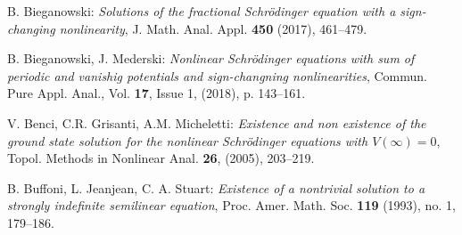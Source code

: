 \documentclass{scrartcl}
\numberwithin{equation}{section}
\begin{document}
\begin{thebibliography}{99}
 B. Bieganowski: {\em Solutions of the fractional Schrödinger equation with a sign-changing nonlinearity}, J. Math. Anal. Appl. \textbf{450} (2017), 461--479.

 B. Bieganowski, J. Mederski: {\em Nonlinear Schr\"odinger equations with sum of periodic and vanishig potentials and sign-changning nonlinearities}, Commun. Pure Appl. Anal., Vol. \textbf{17}, Issue 1, (2018), p. 143--161.




 V. Benci, C.R. Grisanti, A.M. Micheletti: {\em Existence and non existence of the ground state solution for the nonlinear Schr\"odinger equations with $V(\infty) = 0$}, Topol. Methods in Nonlinear Anal. \textbf{26}, (2005), 203--219.





 B. Buffoni, L. Jeanjean, C. A. Stuart: {\em Existence of a nontrivial solution to a strongly indefinite semilinear equation}, Proc. Amer. Math. Soc. \textbf{119} (1993), no. 1, 179--186. 



\end{thebibliography}
\end{document}
